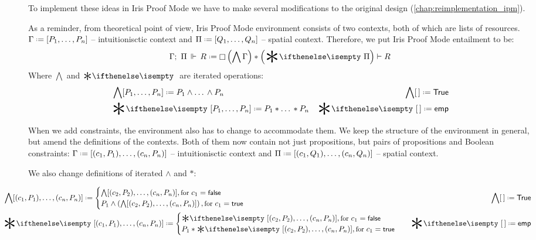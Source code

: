 To implement these ideas in Iris Proof Mode we have to make several modifications to the original design (\ref{chap:reimplementation_ipm}).

As a reminder, from theoretical point of view, Iris Proof Mode environment consists of two contexts, both of which are lists of resources.
\(\IntuD \defeq [\dd P n]\) -- intuitionisctic context and \(\SpatD \defeq [\dd Q n]\) -- spatial context.
Therefore, we put Iris Proof Mode entailment to be: \[\entailsD R \defeq \intuit \left(\bigwedge \IntuD\right) * \left(\Sep \SpatD\right) \vdash R\]
Where \(\bigwedge\) and \(\Sep\) are iterated operations:
\begin{align*}
  & \bigwedge  [\dd P n] \defeq P_1 \wedge \dots\, \wedge P_n
  & \bigwedge [\,] \defeq \True \\
  & \Sep {[\dd P n]} \defeq P_1 * \dots\, * P_n
  & \Sep {[\,]} \defeq \emp
\end{align*}

When we add constraints, the environment also has to change to accommodate them.
We keep the structure of the environment in general, but amend the definitions of the contexts.
Both of them now contain not just propositions, but pairs of propositions and Boolean constraints:
\(\IntuD \defeq [(c_1,P_1),\dots,(c_n,P_n)]\) -- intuitionisctic context and \(\SpatD \defeq [(c_1,Q_1),\dots,(c_n,Q_n)]\) -- spatial context.

We also change definitions of iterated \(\wedge\) and \(*\):\\
\begin{minipage}[t]{1.1\linewidth}
  \begin{align*}
    & \hspace{-0.1\linewidth}
      \bigwedge  [(c_1, P_1), \dots, (c_n, P_n)] \defeq
      \begin{cases}
        \bigwedge [(c_2, P_2), \dots, (c_n, P_n)],
          {\small \text{for } c_1 = \false}\\
        P_1 \wedge \left( \bigwedge [(c_2, P_2), \dots, (c_n, P_n)] \right),
          {\small \text{for } c_1 = \true }
      \end{cases}
    & \bigwedge [\,] \defeq \True \\
    & \hspace{-0.1\linewidth}
      \Sep {[(c_1, P_1), \dots, (c_n, P_n)]} \defeq
      \begin{cases}
        \Sep {[(c_2, P_2), \dots, (c_n, P_n)]},
          {\small \text{for } c_1 = \false} \\
        P_1 * \Sep {[(c_2, P_2), \dots, (c_n, P_n)]},
          {\small \text{for } c_1 = \true}
      \end{cases}
    & \Sep {[\,]} \defeq \emp
  \end{align*}
\end{minipage}

